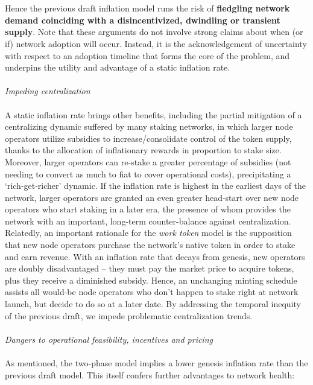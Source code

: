 \documentclass[8pt]{article}
\begin{document}
\\\\
Hence the previous draft inflation model runs the risk of \textbf{fledgling network demand coinciding with a disincentivized, dwindling or transient supply}. Note that these arguments do not involve strong claims about when (or if) network adoption will occur. Instead, it is the acknowledgement of uncertainty with respect to an adoption timeline that forms the core of the problem, and underpins the utility and advantage of a static inflation rate. 
\\\\
\textit{Impeding centralization}
\\\\
A static inflation rate brings other benefits, including the partial mitigation of a centralizing dynamic suffered by many staking networks, in which larger node operators utilize subsidies to increase/consolidate control of the token supply, thanks to the allocation of inflationary rewards in proportion to stake size. Moreover, larger operators can re-stake a greater percentage of subsidies (not needing to convert as much to fiat to cover operational costs), precipitating a `rich-get-richer' dynamic. If the inflation rate is highest in the earliest days of the network, larger operators are granted an even greater head-start over new node operators who start staking in a later era, the presence of whom provides the network with an important, long-term counter-balance against centralization. Relatedly, an important rationale for the \textit{work token} model is the supposition that new node operators purchase the network's native token in order to stake and earn revenue. With an inflation rate that decays from genesis, new operators are doubly disadvantaged – they must pay the market price to acquire tokens, plus they receive a diminished subsidy. Hence, an unchanging minting schedule assists all would-be node operators who don't happen to stake right at network launch, but decide to do so at a later date. By addressing the temporal inequity of the previous draft, we impede problematic centralization trends.
\\\\
\textit{Dangers to operational feasibility, incentives and pricing}
\\\\
As mentioned, the two-phase model implies a lower genesis inflation rate than the previous draft model. This itself confers further advantages to network health:  
\end{document}
